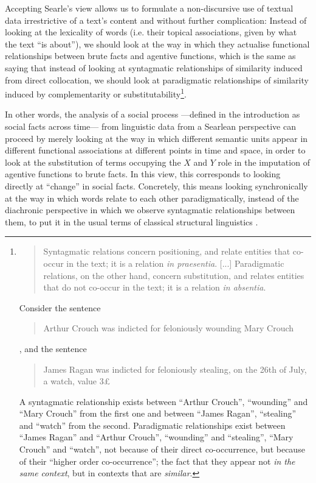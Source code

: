 Accepting Searle's view allows us to formulate a non-discursive use of textual data irrestrictive of a text's content and without further complication:
Instead of looking at the lexicality of words (i.e. their topical associations, given by what the text ``is about''), we should look at the way in which they actualise functional relationships between brute facts and agentive functions, which is the same as saying that instead of looking at syntagmatic relationships of similarity induced from direct collocation, we should look at paradigmatic relationships of similarity induced by complementarity or substitutability\footnote{
    \blockquote[{\citet[p. 60]{sahlgren2006}}]{Syntagmatic relations concern positioning, and relate entities that co-occur in the text; it is a relation \emph{in praesentia}. [...]
    Paradigmatic relations, on the other hand, concern substitution, and relates entities that do not co-occur in the text; it is a
    relation \emph{in absentia}.}
    Consider the sentence \blockquote{
        Arthur Crouch was indicted for feloniously wounding Mary Crouch
    }, and the sentence \blockquote{
        James Ragan was indicted for feloniously stealing, on the 26th of July, a watch, value 3\pounds
    }.
    A syntagmatic relationship exists between ``Arthur Crouch'', ``wounding'' and ``Mary Crouch'' from the first one and between ``James Ragan'', ``stealing'' and ``watch'' from the second.
    Paradigmatic relationships exist between ``James Ragan'' and ``Arthur Crouch'', ``wounding'' and ``stealing'', ``Mary Crouch'' and ``watch'', not because of their direct co-occurrence, but because of their ``higher order co-occurrence''; the fact that they appear not \emph{in the same context}, but in contexts that are \emph{similar}.
}.

In other words, the analysis of a social process ---defined in the introduction as social facts across time--- from linguistic data from a Searlean perspective can proceed by merely looking at the way in which different semantic units appear in different functional associations at different points in time and space, in order to look at the substitution of terms occupying the $X$ and $Y$ role in the imputation of agentive functions to brute facts.
In this view, this corresponds to looking directly at ``change'' in social facts.
Concretely, this means looking synchronically at the way in which words relate to each other paradigmatically, instead of the diachronic perspective in which we observe syntagmatic relationships between them, to put it in the usual terms of classical structural linguistics \citep{desaussure2011}.

